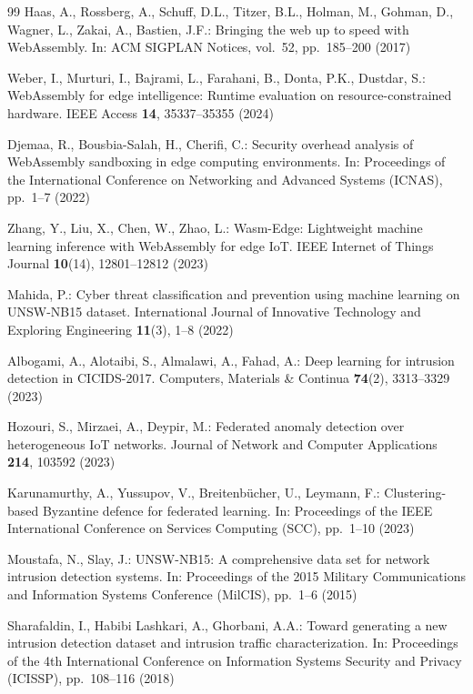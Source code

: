 \documentclass[iicol,Numbered]{sn-jnl}
\begin{document}
\begin{thebibliography}{99}
Haas, A., Rossberg, A., Schuff, D.L., Titzer, B.L., Holman, M., Gohman, D.,
Wagner, L., Zakai, A., Bastien, J.F.:
Bringing the web up to speed with WebAssembly.
In: ACM SIGPLAN Notices, vol.\ 52, pp.\ 185--200 (2017)

Weber, I., Murturi, I., Bajrami, L., Farahani, B., Donta, P.K., Dustdar, S.:
WebAssembly for edge intelligence: Runtime evaluation on resource-constrained
hardware.
IEEE Access \textbf{14}, 35337--35355 (2024)

Djemaa, R., Bousbia-Salah, H., Cherifi, C.:
Security overhead analysis of WebAssembly sandboxing in edge computing
environments.
In: Proceedings of the International Conference on Networking and Advanced
Systems (ICNAS), pp.\ 1--7 (2022)

Zhang, Y., Liu, X., Chen, W., Zhao, L.:
Wasm-Edge: Lightweight machine learning inference with WebAssembly for edge
IoT.
IEEE Internet of Things Journal \textbf{10}(14), 12801--12812 (2023)

Mahida, P.:
Cyber threat classification and prevention using machine learning on
UNSW-NB15 dataset.
International Journal of Innovative Technology and Exploring Engineering
\textbf{11}(3), 1--8 (2022)

Albogami, A., Alotaibi, S., Almalawi, A., Fahad, A.:
Deep learning for intrusion detection in CICIDS-2017.
Computers, Materials \& Continua \textbf{74}(2), 3313--3329 (2023)

Hozouri, S., Mirzaei, A., Deypir, M.:
Federated anomaly detection over heterogeneous IoT networks.
Journal of Network and Computer Applications \textbf{214}, 103592 (2023)

Karunamurthy, A., Yussupov, V., Breitenb{\"u}cher, U., Leymann, F.:
Clustering-based Byzantine defence for federated learning.
In: Proceedings of the IEEE International Conference on Services Computing
(SCC), pp.\ 1--10 (2023)

Moustafa, N., Slay, J.:
UNSW-NB15: A comprehensive data set for network intrusion detection systems.
In: Proceedings of the 2015 Military Communications and Information Systems
Conference (MilCIS), pp.\ 1--6 (2015)

Sharafaldin, I., Habibi Lashkari, A., Ghorbani, A.A.:
Toward generating a new intrusion detection dataset and intrusion traffic
characterization.
In: Proceedings of the 4th International Conference on Information Systems
Security and Privacy (ICISSP), pp.\ 108--116 (2018)


\end{thebibliography}
\end{document}
